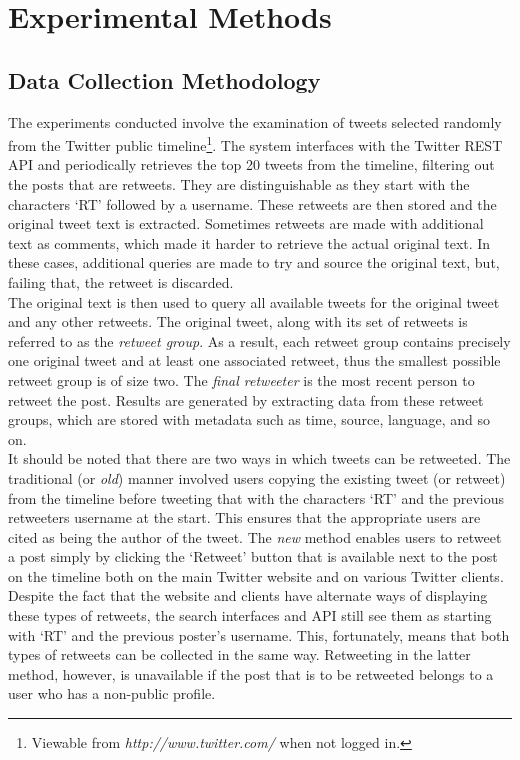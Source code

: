 \section{Experimental Methods}
\label{experimental methods}
\subsection{Data Collection Methodology}
The experiments conducted involve the examination of tweets selected randomly from the Twitter public timeline\footnote{Viewable from \textit{http://www.twitter.com/} when not logged in.}. The system interfaces with the Twitter REST API and periodically retrieves the top 20 tweets from the timeline, filtering out the posts that are retweets. They are distinguishable as they start with the characters `RT' followed by a username. These retweets are then stored and the original tweet text is extracted. Sometimes retweets are made with additional text as comments, which made it harder to retrieve the actual original text. In these cases, additional queries are made to try and source the original text, but, failing that, the retweet is discarded.\\
The original text is then used to query all available tweets for the original tweet and any other retweets. The original tweet, along with its set of retweets is referred to as the \textit{retweet group}. As a result, each retweet group contains precisely one original tweet and at least one associated retweet, thus the smallest possible retweet group is of size two. The \textit{final retweeter} is the most recent person to retweet the post. Results are generated by extracting data from these retweet groups, which are stored with metadata such as time, source, language, and so on.\\
It should be noted that there are two ways in which tweets can be retweeted. The traditional (or \textit{old}) manner involved users copying the existing tweet (or retweet) from the timeline before tweeting that with the characters `RT' and the previous retweeters username at the start. This ensures that the appropriate users are cited as being the author of the tweet. The \textit{new} method enables users to retweet a post simply by clicking the `Retweet' button that is available next to the post on the timeline both on the main Twitter website and on various Twitter clients. Despite the fact that the website and clients have alternate ways of displaying these types of retweets, the search interfaces and API still see them as starting with `RT' and the previous poster's username. This, fortunately, means that both types of retweets can be collected in the same way. Retweeting in the latter method, however, is unavailable if the post that is to be retweeted belongs to a user who has a non-public profile.\\
